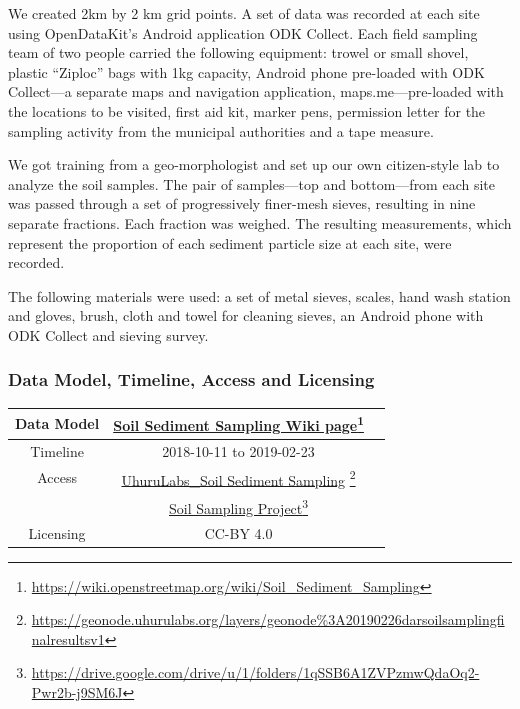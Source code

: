 \documentclass[a4paper,12pt,twoside]{article}
\begin{document}
\begin{multicols}{2}
We created 2km by 2 km grid points. A set of data was recorded at each site using OpenDataKit’s Android application ODK Collect. Each field sampling team of two people carried the following equipment: trowel or small shovel, plastic “Ziploc” bags with 1kg capacity, Android phone pre-loaded with ODK Collect---a separate maps and navigation application, maps.me---pre-loaded with the locations to be visited, first aid kit, marker pens, permission letter for the sampling activity from the municipal authorities and a tape measure. 

We got training from a geo-morphologist and set up our own citizen-style lab to analyze the soil samples. The pair of samples—top and bottom—from each site was passed through a set of progressively finer-mesh sieves, resulting in nine separate fractions. Each fraction was weighed. The resulting measurements, which represent the proportion of each sediment particle size at each site, were
recorded.

The following materials were used: a set of metal sieves, scales, hand wash station and gloves, brush, cloth and towel for cleaning sieves, an Android phone with ODK Collect and sieving survey.
\end{multicols}

\subsubsection{Data Model, Timeline, Access and Licensing}
\begin{center}
  \begin{tabular}{|c|c|c|}  
 \hline
    Data Model    &   \href{https://wiki.openstreetmap.org/wiki/Soil_Sediment_Sampling}{Soil Sediment Sampling Wiki page}\footnote{\url{https://wiki.openstreetmap.org/wiki/Soil_Sediment_Sampling}} \\
 \hline
   Timeline  &   2018-10-11 to 2019-02-23 \\
 \hline  
 Access  & 
    \href{https://geonode.uhurulabs.org/layers/geonode\%3A_2019_02_26_dar_soil_sampling_final_results_v1}{UhuruLabs\_Soil Sediment Sampling} \footnote{\url{https://geonode.uhurulabs.org/layers/geonode\%3A20190226darsoilsamplingfinalresultsv1}}\\
{} & \href{https://drive.google.com/drive/u/1/folders/1qSSB6A1ZVPzmwQdaOq2-Pwr2b-j9SM6J}{Soil Sampling Project}\footnote{\url{https://drive.google.com/drive/u/1/folders/1qSSB6A1ZVPzmwQdaOq2-Pwr2b-j9SM6J}}\\ \hline
Licensing &  CC-BY 4.0 \\
 \hline
  
\end{tabular}
\end{center}
\end{document}
